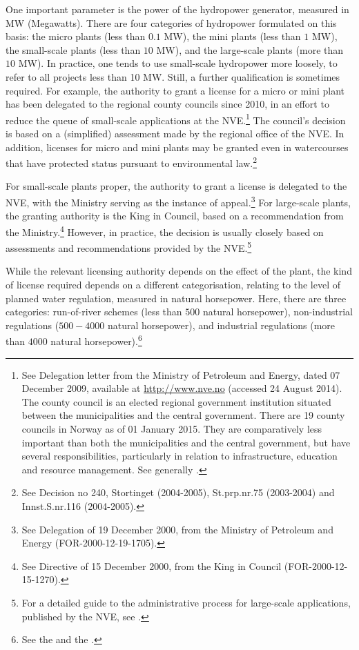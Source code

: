 One important parameter is the power of the hydropower generator, measured in MW (Megawatts). There are four categories of hydropower formulated on this basis: the micro plants (less than $0.1$ MW), the mini plants (less than $1$ MW), the small-scale plants (less than $10$ MW), and the large-scale plants (more than $10$ MW). In practice, one tends to use small-scale hydropower more loosely, to refer to all projects less than 10 MW. Still, a further qualification is sometimes required. For example, the authority to grant a license for a micro or mini plant has been delegated to the regional county councils since 2010, in an effort to reduce the queue of small-scale applications at the NVE.\footnote{See Delegation letter from the Ministry of Petroleum and Energy, dated 07 December 2009, available at \url{http://www.nve.no} (accessed 24 August 2014). The county council is an elected regional government institution situated between the municipalities and the central government. There are 19 county councils in Norway as of 01 January 2015. They are comparatively less important than both the municipalities and the central government, but have several  responsibilities, particularly in relation to infrastructure, education and resource management. See generally \cite{berg15}.} The council's decision is based on a (simplified) assessment made by the regional office of the NVE. In addition, licenses for micro and mini plants may be granted even in watercourses that have protected status pursuant to environmental law.\footnote{See Decision no 240, Stortinget (2004-2005), St.prp.nr.75 (2003-2004) and Innst.S.nr.116 (2004-2005).}

For small-scale plants proper, the authority to grant a license is delegated to the NVE, with the Ministry serving as the instance of appeal.\footnote{See Delegation of 19 December 2000, from the Ministry of Petroleum and Energy (FOR-2000-12-19-1705).} For large-scale plants, the granting authority is the King in Council, based on a recommendation from the Ministry.\footnote{See Directive of 15 December 2000, from the King in Council (FOR-2000-12-15-1270).} However, in practice, the decision is usually closely based on assessments and recommendations provided by the NVE.\footnote{For a detailed guide to the administrative process for large-scale applications, published by the NVE, see \cite{stokker10}.}

While the relevant licensing authority depends on the effect of the plant, the kind of license required depends on a different categorisation, relating to the level of planned water regulation, measured in natural horsepower. Here, there are three categories: run-of-river schemes  (less than $500$ natural horsepower), non-industrial regulations ($500 - 4000$ natural horsepower), and industrial regulations (more than $4000$ natural horsepower).\footnote{See the \dni\cite[2]{wra17} and the \dni\cite[1,2]{ica17}.}

